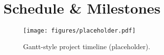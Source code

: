 \chapter{Schedule & Milestones}
\label{chap:schedule}

\begin{figure}[H]
  \centering
  \texttt{[image: figures/placeholder.pdf]}
  \caption{Gantt-style project timeline (placeholder).}
\end{figure}
